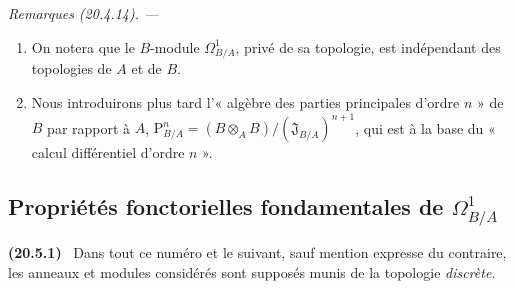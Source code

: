 \documentclass[10pt,oneside]{book}
\makeatletter
\newcommand{\setmanualcurrentlabel}[1]{\def\@currentlabel{#1}}
\newcommand{\oldpage}[2][]{%
  \setcounter{footnote}{0}%
  \marginpar{\scriptsize\textbf{#1}~|~#2}\ignorespaces}
\newenvironment{env}[1][]{\setmanualcurrentlabel{#1}\par\medskip\noindent\textbf{(#1)}\ }{\par}
\newenvironment{remarks}[1][]{%
  \setmanualcurrentlabel{#1}\par\medskip\noindent\itshape Remarques (#1). ---\ }{\par}
\makeatother
\begin{document}
\begin{remarks}[20.4.14]
\label{0.20.4.14-fr}
\begin{enumerate}
  \item[\rm(i)] On notera que le $B$-module $\Omega^1_{B/A}$, privé de sa
  topologie, est indépendant des topologies de $A$ et de $B$.
  \item[\rm(ii)] Nous introduirons plus tard l'« algèbre des parties
  principales d'ordre $n$ » de $B$ par rapport à $A$,
  $\mathrm{P}^n_{B/A}=(B\otimes_A B)/(\mathfrak{J}_{B/A})^{n+1}$, qui est à
  la base du « calcul différentiel d'ordre $n$ ».
\end{enumerate}
\end{remarks}

\subsection{Propriétés fonctorielles fondamentales de
\texorpdfstring{$\Omega^1_{B/A}$}{Omega1(B/A)}}
\label{subsection:0.20.5-fr}

\oldpage[0\textsubscript{IV-1}]{128}
\begin{env}[20.5.1]
\label{0.20.5.1-fr}
Dans tout ce numéro et le suivant, sauf mention expresse du contraire, les
anneaux et modules considérés sont supposés munis de la topologie
\emph{discrète}.
\end{env}
\end{document}
